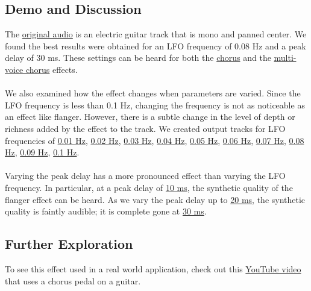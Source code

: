 \subsection{Demo and Discussion}
The \href{run:../InputAudio/22-004 Original Guitar.wav}{original audio} is an electric guitar track that is mono and panned center. We found the best results were obtained for an LFO frequency of 0.08 Hz and a peak delay of 30 ms. These settings can be heard for both the \href{run:../OutputAudio/chorus_22-004 Original Guitar_{freq=0.08Hz}{delay_max=30ms}.wav}{chorus} and the \href{run:../OutputAudio/chorus_multi_22-004 Original Guitar_{freq=0.08Hz}{delay_max=30ms}.wav}{multi-voice chorus} effects. \\ \\
We also examined how the effect changes when parameters are varied. Since the LFO frequency is less than 0.1 Hz, changing the frequency is not as noticeable as an effect like flanger. However, there is a subtle change in the level of depth or richness added by the effect to the track. We created output tracks for LFO frequencies of
\href{run:../OutputAudio/chorus_22-004 Original Guitar_{freq=0.01Hz}{delay_max=30ms}.wav}{0.01 Hz},
\href{run:../OutputAudio/chorus_22-004 Original Guitar_{freq=0.02Hz}{delay_max=30ms}.wav}{0.02 Hz},
\href{run:../OutputAudio/chorus_22-004 Original Guitar_{freq=0.03Hz}{delay_max=30ms}.wav}{0.03 Hz},
\href{run:../OutputAudio/chorus_22-004 Original Guitar_{freq=0.04Hz}{delay_max=30ms}.wav}{0.04 Hz},
\href{run:../OutputAudio/chorus_22-004 Original Guitar_{freq=0.05Hz}{delay_max=30ms}.wav}{0.05 Hz},
\href{run:../OutputAudio/chorus_22-004 Original Guitar_{freq=0.06Hz}{delay_max=30ms}.wav}{0.06 Hz},
\href{run:../OutputAudio/chorus_22-004 Original Guitar_{freq=0.07Hz}{delay_max=30ms}.wav}{0.07 Hz},
\href{run:../OutputAudio/chorus_22-004 Original Guitar_{freq=0.08Hz}{delay_max=30ms}.wav}{0.08 Hz},
\href{run:../OutputAudio/chorus_22-004 Original Guitar_{freq=0.09Hz}{delay_max=30ms}.wav}{0.09 Hz},
\href{run:../OutputAudio/chorus_22-004 Original Guitar_{freq=0.1Hz}{delay_max=30ms}.wav}{0.1 Hz}. \\ \\
Varying the peak delay has a more pronounced effect than varying the LFO frequency. In particular, at a peak delay of \href{run:../OutputAudio/chorus_22-004 Original Guitar_{freq=0.08Hz}{delay_max=10ms}.wav}{10 ms}, the synthetic quality of the flanger effect can be heard. As we vary the peak delay up to \href{run:../OutputAudio/chorus_22-004 Original Guitar_{freq=0.08Hz}{delay_max=20ms}.wav}{20 ms}, the synthetic quality is faintly audible; it is complete gone at \href{run:../OutputAudio/chorus_22-004 Original Guitar_{freq=0.08Hz}{delay_max=30ms}.wav}{30 ms}.

\subsection{Further Exploration}
To see this effect used in a real world application, check out this \href{https://www.youtube.com/watch?v=zmN7fK3fKUE}{YouTube video} that uses a chorus pedal on a guitar.